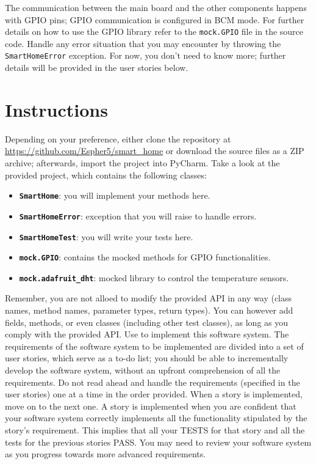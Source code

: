 The communication between the main board and the other components happens with GPIO pins; GPIO communication is configured in BCM mode. For further details on how to use the GPIO library refer to the \texttt{mock.GPIO} file in the source code.
Handle any error situation that you may encounter by throwing the \texttt{SmartHomeError} exception.
For now, you don't need to know more; further details will be provided in the user stories below.


\section{Instructions}
Depending on your preference, either clone the repository at \url{https://github.com/Espher5/smart_home} or download the source files as a ZIP archive; afterwards, import the project into PyCharm. 
Take a look at the provided project, which contains the following classes: 
\begin{itemize}
    \item \textbf{\texttt{SmartHome}}: you will implement your methods here.
    \item \textbf{\texttt{SmartHomeError}}: exception that you will raise to handle errors.
    \item \textbf{\texttt{SmartHomeTest}}: you will write your tests here.
    \item \textbf{\texttt{mock.GPIO}}: contains the mocked methods for GPIO functionalities.
    \item \textbf{\texttt{mock.adafruit\_dht}}: mocked library to control the temperature sensors.
\end{itemize}

Remember, you are not alloed to modify the provided API in any way (\ie class names, method names, parameter types, return types). You can however add fields, methods, or even classes (including other test classes), as long as you comply with the provided API.
Use \tdd to implement this software system.
The requirements of the software system to be implemented are divided into a set of user stories, which serve as a to-do list; you should be able to incrementally develop the software system, without an upfront comprehension of all the requirements. Do not read ahead and handle the requirements (\ie specified in the user stories) one at a time in the order provided.
When a story is implemented, move on to the next one. A story is
implemented when you are confident that your software system correctly implements all the functionality stipulated by the story's requirement. This implies that all your TESTS for that story and all the tests for the previous stories PASS. You may need to review your software system as you progress towards more advanced requirements.


